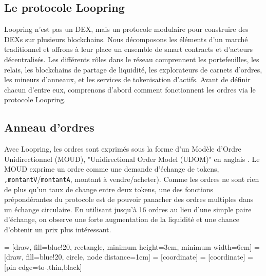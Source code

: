 \documentclass[UTF8,nofonts]{article}
\makeatletter
\newenvironment{figurehere}
 {\def\@captype{figure}}
 {}
\makeatother
\begin{document}
\begin{multicols}{2}
\section{Le protocole Loopring \label{sec:loopring_protocol}}
Loopring n'est pas un DEX, mais un protocole modulaire pour construire des DEXs sur plusieurs blockchains. Nous décomposons les éléments d'un marché traditionnel et offrons à leur place un ensemble de smart contracts et d'acteurs décentralisés. Les différents rôles dans le réseau comprennent les portefeuilles, les relais, les blockchains de partage de liquidité, les explorateurs de carnets d'ordres, les mineurs d'anneaux, et les services de tokenisation d'actifs. Avant de définir chacun d'entre eux, comprenons d'abord comment fonctionnent les ordres via le protocole Loopring.

\subsection{Anneau d'ordres\label{sec:order_ring}}
Avec Loopring, les ordres sont exprimés sous la forme d'un Modèle d'Ordre Unidirectionnel (MOUD), "Unidirectional Order Model (UDOM)" en anglais \cite{coinport2014udom}. Le MOUD exprime un ordre comme une demande d'échange de tokens, \verb|,montantV|/\verb|montantA|, montant à vendre/acheter). Comme les ordres ne sont rien de plus qu'un taux de change entre deux tokens, une des fonctions prépondérantes du protocole est de pouvoir panacher des ordres multiples dans un échange circulaire. En utilisant jusqu'à 16 ordres au lieu d'une simple paire d'échange, on observe une forte augmentation de la liquidité et une chance d'obtenir un prix plus intéressant. 

\begin{center}
\begin{figurehere}
\centering
{} = [draw, fill=blue!20, rectangle, 
    minimum height=3em, minimum width=6em]
 = [draw, fill=blue!20, circle, node distance=1cm]
 = [coordinate]
 = [coordinate]
 = [pin edge={to-,thin,black}]

\begin{tikzpicture}[
    auto, 
    node distance=2cm,
    >=latex',
    font=\bfseries\footnotesize\sffamily,
    order/.style={
		scale=0.7,
		rectangle,
		rounded corners,
		draw=black, 
		text centered,
		minimum height=12mm,
		fill=white
	},
	label/.style={
		scale=0.7
	}
  ]


\end{tikzpicture}
\end{figurehere}
\end{center}
\end{multicols}
\end{document}
